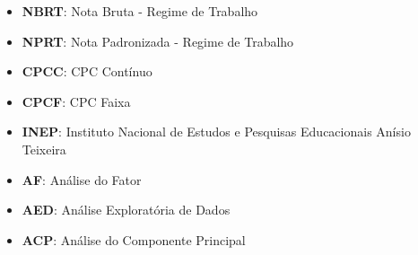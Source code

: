 \begin{itemize}[label={}]
\item \textbf{NBRT}: Nota Bruta - Regime de Trabalho                          
\item \textbf{NPRT}: Nota Padronizada - Regime de Trabalho                    
\item \textbf{CPCC}: CPC Contínuo                                             
\item \textbf{CPCF}: CPC Faixa
\item \textbf{INEP}: Instituto Nacional de Estudos e Pesquisas Educacionais Anísio Teixeira
\item \textbf{AF}: Análise do Fator
\item \textbf{AED}: Análise Exploratória de Dados
\item \textbf{ACP}: Análise do Componente Principal
\end{itemize}  
\pagebreak